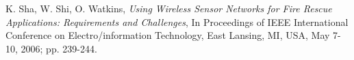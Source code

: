 \documentclass{../local}
\begin{document}
\begin{thebibliography}{9}

 K. Sha, W. Shi, O. Watkins, \emph{Using Wireless Sensor Networks for Fire Rescue Applications: Requirements and Challenges}, In Proceedings of IEEE International Conference on Electro/information Technology, East Lansing, MI, USA, May 7-10, 2006; pp. 239-244.

\end{thebibliography}
\end{document}
